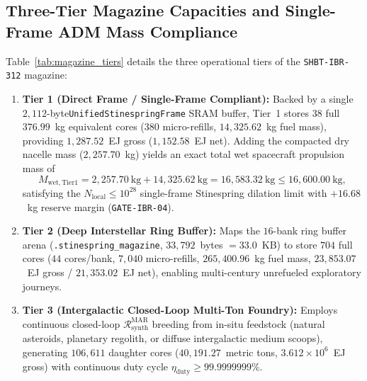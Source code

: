 \documentclass[11pt,onecolumn]{article}
\begin{document}
\subsection{Three-Tier Magazine Capacities and Single-Frame ADM Mass Compliance}
\label{subsec:magazine_tiers}
Table~\ref{tab:magazine_tiers} details the three operational tiers of the \texttt{SHBT-IBR-312} magazine:
\begin{enumerate}
  \item \textbf{Tier 1 (Direct Frame / Single-Frame Compliant):} Backed by a single $2{,}112$-byte\linebreak \texttt{UnifiedStinespringFrame} SRAM buffer, Tier~1 stores $38$ full $376.99$~kg equivalent cores ($380$ micro-refills, $14{,}325.62$~kg fuel mass), providing $1{,}287.52$~EJ gross ($1{,}152.58$~EJ net). Adding the compacted dry nacelle mass ($2{,}257.70$~kg) yields an exact total wet spacecraft propulsion mass of
  \begin{equation}
    M_{\mathrm{wet,Tier1}} = 2{,}257.70~\mathrm{kg} + 14{,}325.62~\mathrm{kg} = 16{,}583.32~\mathrm{kg} \le 16{,}600.00~\mathrm{kg},
    \label{eq:tier1_adm_limit}
  \end{equation}
  satisfying the $N_{\mathrm{local}} \le 10^{28}$ single-frame Stinespring dilation limit with $+16.68$~kg reserve margin (\texttt{GATE-IBR-04}).
  \item \textbf{Tier 2 (Deep Interstellar Ring Buffer):} Maps the $16$-bank ring buffer arena (\texttt{.stinespring\_}\allowbreak\texttt{magazine}, $33{,}792$~bytes $= 33.0$~KB) to store $704$ full cores ($44$ cores/bank, $7{,}040$ micro-refills, $265{,}400.96$~kg fuel mass, $23{,}853.07$~EJ gross / $21{,}353.02$~EJ net), enabling multi-century unrefueled exploratory journeys.
  \item \textbf{Tier 3 (Intergalactic Closed-Loop Multi-Ton Foundry):} Employs continuous closed-loop $\mathcal{R}_{\mathrm{synth}}^{\mathrm{MAR}}$ breeding from in-situ feedstock (natural asteroids, planetary regolith, or diffuse intergalactic medium scoops), generating $106{,}611$ daughter cores ($40{,}191.27$~metric tons, $3.612\times 10^6$~EJ gross) with continuous duty cycle $\eta_{\mathrm{duty}} \ge 99.9999999\%$.
\end{enumerate}
\end{document}
